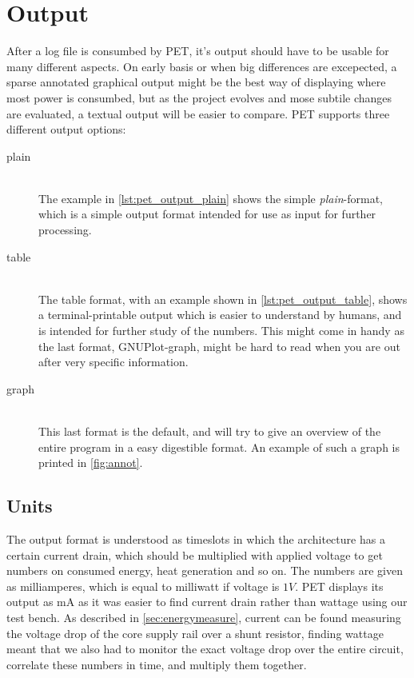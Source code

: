 \section{Output}
\label{sec:output}

After a log file is consumbed by PET, it's output should have to be usable for
many different aspects. On early basis or when big differences are excepected, a
sparse annotated graphical output might be the best way of displaying where most
power is consumbed, but as the project evolves and mose subtile changes are
evaluated, a textual output will be easier to compare. PET supports three
different output options:

\begin{description}
    \item[plain]\hfill\\
        The example in \autoref{lst:pet_output_plain} shows the simple
        \emph{plain}-format, which is a simple output format intended for
        use as input for further processing.
    \item[table]\hfill\\
        The table format, with an example shown in \autoref{lst:pet_output_table},
        shows a terminal-printable output which is easier to understand by
        humans, and is intended for further study of the numbers. This might
        come in handy as the last format, GNUPlot-graph, might be hard to
        read when you are out after very specific information.
    \item[graph]\hfill\\
        This last format is the default, and will try to give an overview of
        the entire program in a easy digestible format. An example of such
        a graph is printed in \autoref{fig:annot}.
\end{description}

\subsection{Units}

The output format is understood as timeslots in which the architecture has a
certain current drain, which should be multiplied with applied voltage to get
numbers on consumed energy, heat generation and so on. The numbers are given as
milliamperes, which is equal to milliwatt if voltage is $1V$. PET displays its
output as mA as it was easier to find current drain rather than wattage using
our test bench. As described in \autoref{sec:energymeasure}, current can be
found measuring the voltage drop of the core supply rail over a shunt resistor,
finding wattage meant that we also had to monitor the exact voltage drop over
the entire circuit, correlate these numbers in time, and multiply them together.

